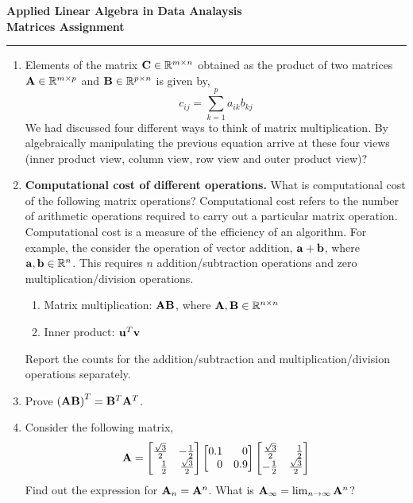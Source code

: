 \documentclass[12pt]{article}
\def\mf{\ensuremath\mathbf}
\def\mb{\ensuremath\mathbb}
\def\lp{\ensuremath\left(}
\def\rp{\ensuremath\right)}
\def\bmx{\ensuremath\begin{bmatrix*}[r]}
\def\emx{\ensuremath\end{bmatrix*}}
\newcommand{\ct}[1]{\lp #1\rp}
\begin{document}
\begin{center}
\begin{Large}
\textbf{Applied Linear Algebra in Data Analaysis}\\
\vspace{0.1cm}
\textbf{Matrices Assignment}
\end{Large}
\end{center}
\hrule
\vspace{0.2cm}

\begin{enumerate}
\item Elements of the matrix $\mf{C} \in \mb{R}^{m \times n}$ obtained as the product of two matrices $\mf{A} \in \mb{R}^{m \times p}$ and $\mf{B} \in \mb{R}^{p \times n}$ is given by,
\[ c_{ij} = \sum_{k=1}^{p}a_{ik}b_{kj} \]
We had discussed four different ways to think of matrix multiplication. By algebraically manipulating the previous equation arrive at these four views (inner product view, column view, row view and outer product view)? 

\item \textbf{Computational cost of different operations.} What is computational cost of the following matrix operations? Computational cost refers to the number of arithmetic operations  required to carry out a particular matrix operation. Computational cost is a measure of the efficiency of an algorithm. For example, the consider the operation of vector addition, $\mf{a} + \mf{b}$, where $\mf{a}, \mf{b} \in \mb{R}^n$. This requires $n$ addition/subtraction operations and zero multiplication/division operations.
\begin{enumerate}
    \item Matrix multiplication: $\mf{AB}$, where $\mf{A}, \mf{B} \in \mb{R}^{n \times n}$
    \item Inner product: $\mf{u}^T\mf{v}$
\end{enumerate} 
Report the counts for the addition/subtraction and multiplication/division operations separately. 

\item Prove $\ct{\mf{A}\mf{B}}^T = \mf{B}^T\mf{A}^T$.

\item Consider the following matrix,
\[ \mf{A} = \bmx \frac{\sqrt{3}}{2} & -\frac{1}{2}\\\frac{1}{2} & \frac{\sqrt{3}}{2} \emx \bmx 0.1 & 0\\0 & 0.9 \emx \bmx \frac{\sqrt{3}}{2} & \frac{1}{2}\\-\frac{1}{2} & \frac{\sqrt{3}}{2} \emx \]
Find out the expression for $\mf{A}_n = \mf{A}^n$. What is $\mf{A}_\infty = \lim_{n\to\infty} \mf{A}^n$?


\end{enumerate}
\end{document}
